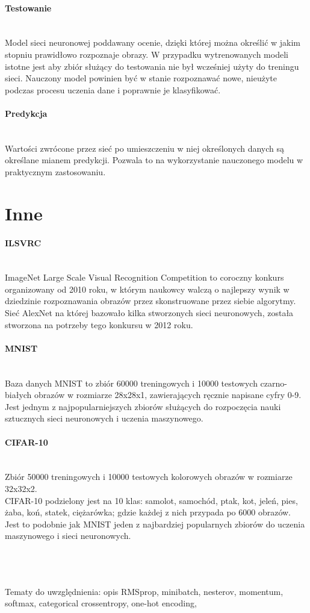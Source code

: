 \paragraph{Testowanie} \mbox{}\\
Model sieci neuronowej poddawany ocenie, dzięki której można określić w jakim stopniu
prawidłowo rozpoznaje obrazy. W przypadku wytrenowanych modeli istotne jest aby zbiór służący do
testowania nie był wcześniej użyty do treningu sieci. Nauczony model powinien być w stanie
rozpoznawać nowe, nieużyte podczas procesu uczenia dane i poprawnie je klasyfikować.

\paragraph{Predykcja} \mbox{}\\
Wartości zwrócone przez sieć po umieszczeniu w niej określonych danych są określane
mianem predykcji. Pozwala to na wykorzystanie nauczonego modelu w praktycznym
zastosowaniu.

\section{Inne}

\paragraph{ILSVRC} \mbox{}\\
ImageNet Large Scale Visual Recognition Competition to coroczny konkurs organizowany
od 2010 roku, w którym naukowcy walczą o najlepszy wynik w dziedzinie rozpoznawania
obrazów przez skonstruowane przez siebie algorytmy. Sieć AlexNet na której bazowało
kilka stworzonych sieci neuronowych, została stworzona na potrzeby tego konkursu
w 2012 roku.

\paragraph{MNIST} \mbox{}\\
Baza danych MNIST to zbiór 60000 treningowych i 10000 testowych czarno-białych obrazów
w rozmiarze 28x28x1, zawierających ręcznie napisane cyfry 0-9. Jest jednym z
najpopularniejszych zbiorów służących do rozpoczęcia nauki sztucznych sieci neuronowych
i uczenia maszynowego.

\paragraph{CIFAR-10} \mbox{}\\
Zbiór 50000 treningowych i 10000 testowych kolorowych obrazów w rozmiarze 32x32x2.\\
CIFAR-10 podzielony jest na 10 klas: samolot, samochód, ptak, kot, jeleń, pies, żaba,
koń, statek, ciężarówka; gdzie każdej z nich przypada po 6000 obrazów. Jest to podobnie
jak MNIST jeden z najbardziej popularnych zbiorów do uczenia maszynowego i sieci neuronowych.


\\\\\\
Tematy do uwzględnienia:
opis RMSprop,
minibatch,
nesterov,
momentum,
softmax,
categorical crossentropy,
one-hot encoding,
